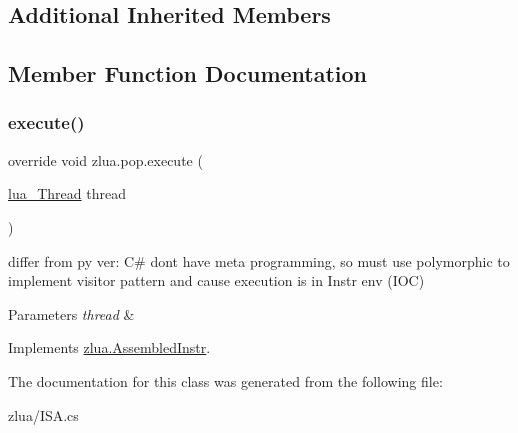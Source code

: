 \subsection*{Additional Inherited Members}


\subsection{Member Function Documentation}
\mbox{\label{classzlua_1_1pop_a72cea959966aec69448d61be5bfc322c}} 
\subsubsection{\texorpdfstring{execute()}{execute()}}
{\footnotesize\ttfamily override void zlua.\+pop.\+execute (\begin{DoxyParamCaption}\item[{\mbox{\hyperlink{classzlua_1_1lua___thread}{lua\+\_\+\+Thread}}}]{thread }\end{DoxyParamCaption})\hspace{0.3cm}{\ttfamily [virtual]}}



differ from py ver\+: C\# dont have meta programming, so must use polymorphic to implement visitor pattern and cause execution is in Instr env (I\+OC) 


\begin{DoxyParams}{Parameters}
{\em thread} & \\
\hline
\end{DoxyParams}


Implements \mbox{\hyperlink{classzlua_1_1_assembled_instr_a44e081c4565b90b75e4a67b8dd418feb}{zlua.\+Assembled\+Instr}}.



The documentation for this class was generated from the following file\+:\begin{DoxyCompactItemize}
\item 
zlua/I\+S\+A.\+cs\end{DoxyCompactItemize}
